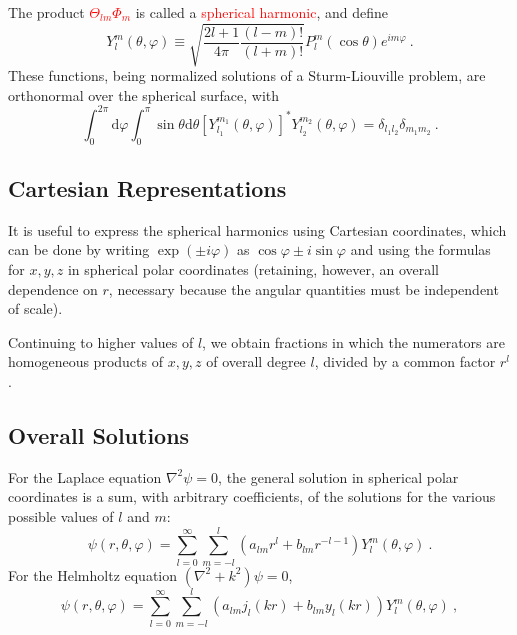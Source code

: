 \documentclass[12pt,a4paper]{article}
\newcommand{\dif}{\mathrm{d}}
\begin{document}
The product \textcolor{red}{$\Theta_{lm}\Phi_m$} is called a \textcolor{red}{spherical harmonic}, and define
\begin{equation}
Y_l^m(\theta, \varphi) \equiv \sqrt{\dfrac{2l+1}{4\pi} \dfrac{(l-m)!}{(l+m)!} } P_l^m (\cos \theta) e^{i m \varphi} ~.
\end{equation}
These functions, being normalized solutions of a Sturm-Liouville problem, are orthonormal over the spherical surface, with
\begin{equation}
\int_0^{2\pi } \dif \varphi \int_0^\pi \sin \theta \dif \theta [Y_{l_1}^{m_1}(\theta, \varphi)]^\ast Y_{l_2}^{m_2}(\theta, \varphi) = \delta_{l_1 l_2} \delta_{m_1 m_2} ~.
\end{equation}

\subsection{Cartesian Representations}
It is useful to express the spherical harmonics using Cartesian coordinates, which can be done by writing $\exp(\pm i\varphi)$ as $\cos \varphi \pm i \sin \varphi$ and using the formulas for $x, y, z$ in spherical polar coordinates (retaining, however, an overall dependence on $r$, necessary because the angular quantities must be independent of scale).

Continuing to higher values of $l$, we obtain fractions in which the numerators are homogeneous products of $x, y, z$ of overall degree $l$, divided by a common factor $r^l$.

\subsection{Overall Solutions}








For the Laplace equation $\nabla^2 \psi = 0$, the general solution in spherical polar coordinates is a sum, with arbitrary coefficients, of the solutions for the various possible values of $l$ and $m$:
\begin{equation}
\psi(r, \theta, \varphi) = \sum_{l = 0}^\infty \sum_{m = -l}^l (a_{lm} r^l +b_{lm} r^{-l-1}) Y_l^m (\theta, \varphi) ~.
\end{equation}
For the Helmholtz equation $(\nabla^2 + k^2) \psi = 0$,
\begin{equation}
\psi(r, \theta, \varphi) = \sum_{l = 0}^\infty \sum_{m = -l}^l (a_{lm} j_l(kr) +b_{lm} y_l(kr)) Y_l^m (\theta, \varphi) ~,
\end{equation}
\end{document}
